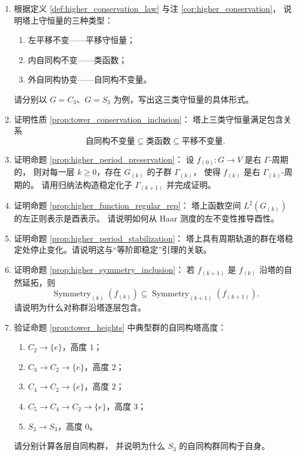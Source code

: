 \begin{enumerate}[leftmargin=3em, label=\textbf{题 \arabic*}]
    \item 根据定义 \ref{def:higher_conservation_law} 与注 \ref{cor:higher_conservation}，
    说明塔上守恒量的三种类型：
    \begin{enumerate}[label=(\roman*)]
        \item 左平移不变——平移守恒量；
        \item 内自同构不变——类函数；
        \item 外自同构协变——自同构不变量。
    \end{enumerate}
    请分别以 $G=C_3$、$G=S_3$ 为例，写出这三类守恒量的具体形式。

    \item 证明性质 \ref{prop:tower_conservation_inclusion}：
    塔上三类守恒量满足包含关系
    \[
    \text{自同构不变量}\subseteq\text{类函数}\subseteq\text{平移不变量}.
    \]

    \item 证明命题 \ref{prop:higher_period_preservation}：
    设 $f_{(0)}:G\to V$ 是右 $\Gamma$-周期的，
    则对每一层 $k\ge0$，存在 $G_{(k)}$ 的子群 $\Gamma_{(k)}$，
    使得 $f_{(k)}$ 是右 $\Gamma_{(k)}$-周期的。
    请用归纳法构造稳定化子 $\Gamma_{(k+1)}$ 并完成证明。

    \item 证明命题 \ref{prop:higher_function_regular_rep}：
    塔上函数空间 $L^2(G_{(k)})$ 的左正则表示是酉表示。
    请说明如何从 Haar 测度的左不变性推导酉性。

    \item 证明命题 \ref{prop:higher_period_stabilization}：
    塔上具有周期轨道的群在塔稳定处停止变化。请说明这与“等阶即稳定”引理的关联。

    \item 证明命题 \ref{prop:higher_symmetry_inclusion}：
    若 $f_{(k+1)}$ 是 $f_{(k)}$ 沿塔的自然延拓，则
    \[
    \operatorname{Symmetry}_{(k)}(f_{(k)})\subseteq
    \operatorname{Symmetry}_{(k+1)}(f_{(k+1)}).
    \]
    请说明为什么对称群沿塔逐层包含。

    \item 验证命题 \ref{prop:tower_heights} 中典型群的自同构塔高度：
    \begin{enumerate}[label=(\roman*)]
        \item $C_2\to\{e\}$，高度 $1$；
        \item $C_3\to C_2\to\{e\}$，高度 $2$；
        \item $C_4\to C_2\to\{e\}$，高度 $2$；
        \item $C_5\to C_4\to C_2\to\{e\}$，高度 $3$；
        \item $S_3\to S_3$，高度 $0$。
    \end{enumerate}
    请分别计算各层自同构群，
    并说明为什么 $S_3$ 的自同构群同构于自身。


\end{enumerate}
